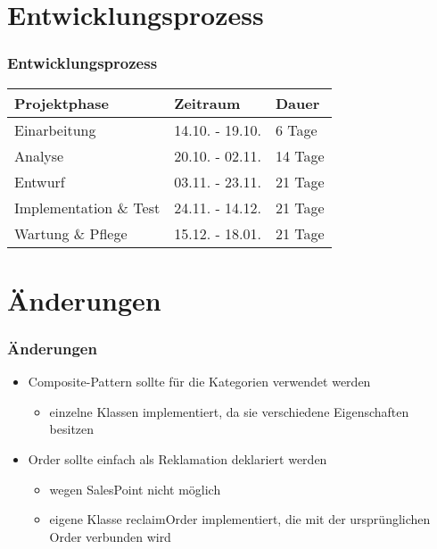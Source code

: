 \documentclass[]{tudbeamer}
\begin{document}
\section{Entwicklungsprozess}
\begin{frame}
\frametitle{Entwicklungsprozess}
\begin{tabular}{p{}|p{}|p{}}
Projektphase & Zeitraum & Dauer\\ \hline
Einarbeitung & 14.10. - 19.10. & 6 Tage\\
Analyse & 20.10. - 02.11. & 14 Tage\\
Entwurf & 03.11. - 23.11. & 21 Tage\\
Implementation \& Test & 24.11. - 14.12. & 21 Tage\\
Wartung \& Pflege & 15.12. - 18.01. & 21 Tage\\
\end{tabular}
\end{frame}

\section{\"Anderungen}
\begin{frame}
\frametitle{\"Anderungen}
\begin{itemize}
\item Composite-Pattern sollte f\"ur die Kategorien verwendet werden
\begin{itemize}
\item einzelne Klassen implementiert, da sie verschiedene Eigenschaften besitzen
\end{itemize}
\item Order sollte einfach als Reklamation deklariert werden
\begin{itemize}
\item wegen SalesPoint nicht möglich
\item eigene Klasse reclaimOrder implementiert, die mit der ursprünglichen Order verbunden wird
\end{itemize}
\end{itemize}
\end{frame}
\end{document}
